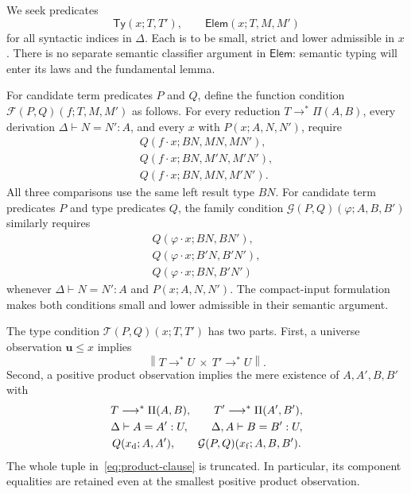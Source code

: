 \documentclass[11pt,a4paper]{article}
\theoremstyle{definition}
\theoremstyle{remark}
\newcommand{\TyRel}{\mathsf{Ty}}
\newcommand{\ElemRel}{\mathsf{Elem}}
\newcommand{\trunc}[1]{\left\lVert #1\right\rVert}
\newcommand{\appl}{\mathbin{\cdot}}
\begin{document}
We seek predicates
\[
 \TyRel(x;T,T'),\qquad \ElemRel(x;T,M,M')
\]
for all syntactic indices in $\Delta$. Each is to be small, strict and
lower admissible in $x$. There is no separate semantic classifier
argument in $\ElemRel$: semantic typing will enter its laws and the
fundamental lemma.

For candidate term predicates $P$ and $Q$, define the function condition
$\mathcal F(P,Q)(f;T,M,M')$ as follows. For every reduction
$T\longrightarrow^*\Pi(A,B)$, every derivation
$\Delta\vdash N=N':A$, and every $x$ with $P(x;A,N,N')$, require
\begin{equation}\label{eq:function-outputs}
\begin{aligned}
 Q(f\appl x;B N,MN,MN'),\\
 Q(f\appl x;B N,M'N,M'N'),\\
 Q(f\appl x;B N,MN,M'N').
\end{aligned}
\end{equation}
All three comparisons use the same left result type $B N$.
For candidate term predicates $P$ and type predicates $Q$, the family
condition $\mathcal G(P,Q)(\varphi;A,B,B')$ similarly requires
\begin{equation}\label{eq:family-outputs}
\begin{aligned}
 Q(\varphi\appl x;B N,B N'),\\
 Q(\varphi\appl x;B' N,B' N'),\\
 Q(\varphi\appl x;B N,B' N')
\end{aligned}
\end{equation}
whenever $\Delta\vdash N=N':A$ and $P(x;A,N,N')$.
The compact-input formulation makes both conditions small and lower
admissible in their semantic argument.

The type condition $\mathcal T(P,Q)(x;T,T')$ has two parts.
First, a universe observation $\mathbf u\leq x$ implies
\[
 \trunc{T\longrightarrow^*U\ \mathbin{\times}\ T'\longrightarrow^*U}.
\]
Second, a positive product observation implies the mere existence of
$A,A',B,B'$ with
\begin{equation}\label{eq:product-clause}
\begin{gathered}
 T\longrightarrow^*\Pi(A,B),\qquad
 T'\longrightarrow^*\Pi(A',B'),\\
 \Delta\vdash A=A':U,\qquad
 \Delta,A\vdash B=B':U,\\
 Q(x_{\rm d};A,A'),\qquad
 \mathcal G(P,Q)(x_{\rm f};A,B,B').
\end{gathered}
\end{equation}
The whole tuple in~\eqref{eq:product-clause} is truncated. In particular,
its component equalities are retained even at the smallest positive
product observation.
\end{document}
